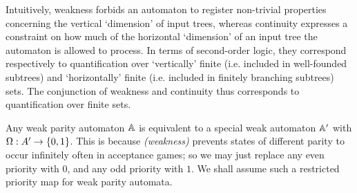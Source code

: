 Intuitively, weakness forbids an automaton to register non-trivial properties 
concerning the vertical `dimension' of input trees, whereas continuity expresses
a constraint on how much of the horizontal `dimension' of an input tree the 
automaton is allowed to process. 
In terms of second-order logic, they correspond respectively to quantification 
over `vertically' finite (i.e. included in well-founded subtrees) and 
`horizontally' finite (i.e. included in finitely branching subtrees) sets. 
The conjunction of weakness and continuity thus corresponds to quantification 
over finite sets. 

\begin{remark}\label{rmk:weak01}
Any weak parity automaton $\mathbb{A}$ is equivalent to a special weak automaton
$\mathbb{A}'$ with $\Omega: A' \to \{0,1\}$. 
This is because \emph{(weakness)} prevents states of different parity to occur
infinitely often in acceptance games; so we may just replace any even priority 
with $0$, and any odd priority with $1$.
We shall assume such a restricted priority map for weak parity automata.
\end{remark}


